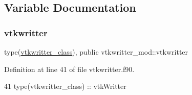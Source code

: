 \subsection{Variable Documentation}
\mbox{\label{namespacevtkwritter__mod_a80eabc5e7153822e7ddd54b662294c81}} 
\subsubsection{\texorpdfstring{vtkwritter}{vtkwritter}}
{\footnotesize\ttfamily type(\mbox{\hyperlink{structvtkwritter__mod_1_1vtkwritter__class}{vtkwritter\+\_\+class}}), public vtkwritter\+\_\+mod\+::vtkwritter}



Definition at line 41 of file vtkwritter.\+f90.


\begin{DoxyCode}
41     \textcolor{keywordtype}{type}(vtkwritter\_class) :: vtkWritter
\end{DoxyCode}

